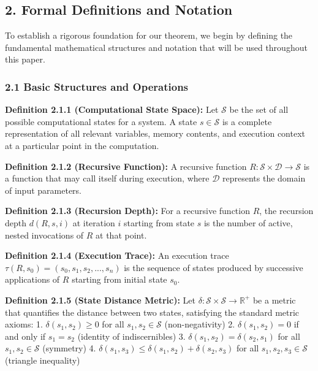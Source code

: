 \documentclass[
]{article}
\begin{document}
\subsection{2. Formal Definitions and
Notation}\label{formal-definitions-and-notation}

To establish a rigorous foundation for our theorem, we begin by defining
the fundamental mathematical structures and notation that will be used
throughout this paper.

\subsubsection{2.1 Basic Structures and
Operations}\label{basic-structures-and-operations}

\textbf{Definition 2.1.1 (Computational State Space):} Let
\(\mathcal{S}\) be the set of all possible computational states for a
system. A state \(s \in \mathcal{S}\) is a complete representation of
all relevant variables, memory contents, and execution context at a
particular point in the computation.

\textbf{Definition 2.1.2 (Recursive Function):} A recursive function
\(R: \mathcal{S} \times \mathcal{D} \rightarrow \mathcal{S}\) is a
function that may call itself during execution, where \(\mathcal{D}\)
represents the domain of input parameters.

\textbf{Definition 2.1.3 (Recursion Depth):} For a recursive function
\(R\), the recursion depth \(d(R, s, i)\) at iteration \(i\) starting
from state \(s\) is the number of active, nested invocations of \(R\) at
that point.

\textbf{Definition 2.1.4 (Execution Trace):} An execution trace
\(\tau(R, s_0) = (s_0, s_1, s_2, ..., s_n)\) is the sequence of states
produced by successive applications of \(R\) starting from initial state
\(s_0\).

\textbf{Definition 2.1.5 (State Distance Metric):} Let
\(\delta: \mathcal{S} \times \mathcal{S} \rightarrow \mathbb{R}^+\) be a
metric that quantifies the distance between two states, satisfying the
standard metric axioms: 1. \(\delta(s_1, s_2) \geq 0\) for all
\(s_1, s_2 \in \mathcal{S}\) (non-negativity) 2.
\(\delta(s_1, s_2) = 0\) if and only if \(s_1 = s_2\) (identity of
indiscernibles) 3. \(\delta(s_1, s_2) = \delta(s_2, s_1)\) for all
\(s_1, s_2 \in \mathcal{S}\) (symmetry) 4.
\(\delta(s_1, s_3) \leq \delta(s_1, s_2) + \delta(s_2, s_3)\) for all
\(s_1, s_2, s_3 \in \mathcal{S}\) (triangle inequality)
\end{document}
